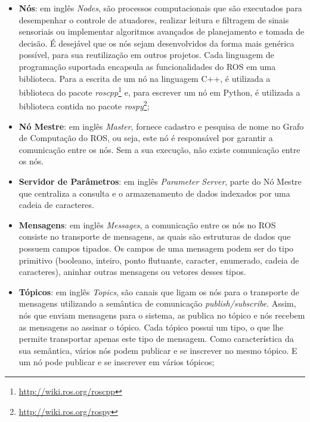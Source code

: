                 \begin{itemize}
                    \item \textbf{Nós}: em inglês \textit{Nodes}, são processos computacionais que são executados para desempenhar o controle de atuadores, realizar leitura e filtragem de sinais sensoriais ou implementar algoritmos avançados de planejamento e tomada de decisão. É desejável que os nós sejam desenvolvidos da forma mais genérica possível, para sua reutilização em outros projetos. Cada linguagem de programação suportada encapsula as funcionalidades do ROS em uma biblioteca. Para a escrita de um nó na linguagem C++, é utilizada a biblioteca do pacote \textit{roscpp}\footnote{\url{http://wiki.ros.org/roscpp}} e, para escrever um nó em Python, é utilizada a biblioteca contida no pacote \textit{rospy}\footnote{\url{http://wiki.ros.org/rospy}};
                    
                    \item \textbf{Nó Mestre}: em inglês \textit{Master}, fornece cadastro e pesquisa de nome no Grafo de Computação do ROS, ou seja, este nó é responsável por garantir a comunicação entre os nós. Sem a sua execução, não existe comunicação entre os nós.
                    
                    \item \textbf{Servidor de Parâmetros}: em inglês \textit{Parameter Server}, parte do Nó Mestre que centraliza a consulta e o armazenamento de dados indexados por uma cadeia de caracteres.
                    
                    \item \textbf{Mensagens}: em inglês \textit{Messages}, a comunicação entre os nós no ROS consiste no transporte de mensagens, as quais são estruturas de dados que possuem campos tipados. Os campos de uma mensagem podem ser do tipo primitivo (booleano, inteiro, ponto flutuante, caracter, enumerado, cadeia de caracteres), aninhar outras mensagens ou vetores desses tipos. 
                    
                    \item \textbf{Tópicos}: em inglês \textit{Topics}, são canais que ligam os nós para o transporte de mensagens utilizando a semântica de comunicação \textit{publish/subscribe}. Assim, nós que enviam mensagens para o sistema, as publica no tópico e nós recebem as mensagens ao assinar o tópico. Cada tópico possui um tipo, o que lhe permite transportar apenas este tipo de mensagem. Como característica da sua semântica, vários nós podem publicar e se inscrever no mesmo tópico. E um nó pode publicar e se inscrever em vários tópicos;
                    

\end{itemize}
